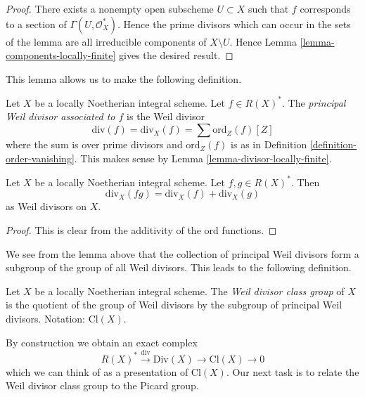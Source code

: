 \begin{proof}
There exists a nonempty open subscheme $U \subset X$ such that $f$
corresponds to a section of $\Gamma(U, \mathcal{O}_X^*)$. Hence the
prime divisors which can occur in the sets of the lemma are all
irreducible components of $X \setminus U$.
Hence Lemma \ref{lemma-components-locally-finite} gives the desired result.
\end{proof}

\noindent
This lemma allows us to make the following definition.

\begin{definition}
\label{definition-principal-divisor}
Let $X$ be a locally Noetherian integral scheme. Let $f \in R(X)^*$.
The {\it principal Weil divisor associated to $f$} is the Weil divisor
$$
\text{div}(f) = \text{div}_X(f) = \sum \text{ord}_Z(f) [Z]
$$
where the sum is over prime divisors and $\text{ord}_Z(f)$ is as in
Definition \ref{definition-order-vanishing}. This makes sense
by Lemma \ref{lemma-divisor-locally-finite}.
\end{definition}

\begin{lemma}
\label{lemma-div-additive}
Let $X$ be a locally Noetherian integral scheme. Let $f, g \in R(X)^*$. Then
$$
\text{div}_X(fg) = \text{div}_X(f) + \text{div}_X(g)
$$
as Weil divisors on $X$.
\end{lemma}

\begin{proof}
This is clear from the additivity of the $\text{ord}$ functions.
\end{proof}

\noindent
We see from the lemma above that the collection of principal Weil divisors
form a subgroup of the group of all Weil divisors. This leads to the following
definition.

\begin{definition}
\label{definition-class-group}
Let $X$ be a locally Noetherian integral scheme. The
{\it Weil divisor class group} of $X$ is the quotient of
the group of Weil divisors by the subgroup of principal Weil divisors.
Notation: $\text{Cl}(X)$.
\end{definition}

\noindent
By construction we obtain an exact complex
\begin{equation}
\label{equation-Weil-divisor-class}
R(X)^* \xrightarrow{\text{div}} \text{Div}(X) \to \text{Cl}(X) \to 0
\end{equation}
which we can think of as a presentation of $\text{Cl}(X)$. Our next task
is to relate the Weil divisor class group to the Picard group.






